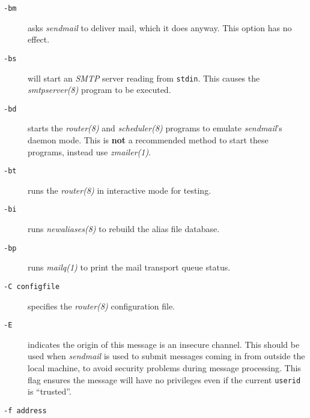 \begin{description}
\item[ {\tt -bm}] \mbox{}

asks {\em sendmail\/} to deliver mail, which it does anyway. 
This option has no effect.



\item[ {\tt -bs}] \mbox{}

will start an {\em SMTP\/} server reading from {\tt stdin}. 
This causes the {\em smtpserver(8)\/} program to be executed.



\item[ {\tt -bd}] \mbox{}

starts the {\em router(8)\/} and {\em scheduler(8)\/} 
programs to emulate {\em sendmail\/}'s daemon mode. This is {\bf not} a 
recommended method to start these programs, instead use {\em zmailer(1)\/}.



\item[ {\tt -bt}] \mbox{}

runs the {\em router(8)\/} in interactive mode for testing.



\item[ {\tt -bi}] \mbox{}

runs {\em newaliases(8)\/} to rebuild the alias file database.



\item[ {\tt -bp}] \mbox{}

runs {\em mailq(1)\/} to print the mail transport queue status.



\item[ {\tt -C configfile}] \mbox{}

specifies the {\em router(8)\/} configuration file.



\item[ {\tt -E}] \mbox{}

indicates the origin of this message is an insecure 
channel. This should be used when {\em sendmail\/} is used to submit 
messages coming in from outside the local machine, to avoid security 
problems during message processing. This flag ensures the message will 
have no privileges even if the current {\tt userid} is ``trusted''.



\item[ {\tt -f address}] \mbox{}


\end{description}
